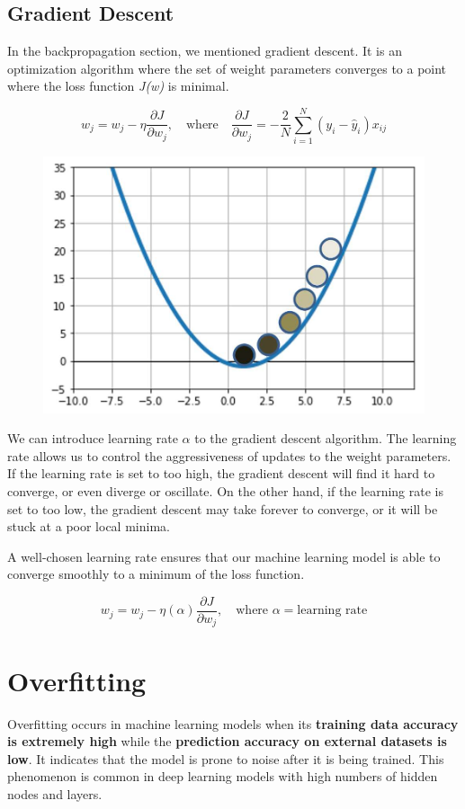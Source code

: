 \documentclass[12pt]{article}
\begin{document}
\subsection{Gradient Descent}
In the backpropagation section, we mentioned gradient descent. It is an optimization algorithm where the set of weight parameters converges to a point where the loss function \textit{J(w)} is minimal. 

\[
w_j = w_j - \eta \frac{\partial J}{\partial w_j}
, \quad \text{where} \quad
\frac{\partial J}{\partial w_j} = -\frac{2}{N} \sum_{i=1}^{N} (y_i - \hat{y}_i) x_{ij}
\]

\begin{figure}[h]
\centering
  \includegraphics[width=0.475\linewidth]{images/lecture_04/img_8.png}
  \label{fig:img_8}
\end{figure}

\newpage
We can introduce learning rate $\alpha$ to the gradient descent algorithm. The learning rate allows us to control the aggressiveness of updates to the weight parameters. If the learning rate is set to too high, the gradient descent will find it hard to converge, or even diverge or oscillate. On the other hand, if the learning rate is set to too low, the gradient descent may take forever to converge, or it will be stuck at a poor local minima.
\vspace{1.5em}

A well-chosen learning rate ensures that our machine learning model is able to converge smoothly to a minimum of the loss function.

\[
w_j = w_j - \eta (\alpha) \frac{\partial J}{\partial w_j}, \quad \text{where } \alpha = \text{learning rate} 
\]

\section{Overfitting}
Overfitting occurs in machine learning models when its \textbf{training data accuracy is extremely high} while the \textbf{prediction accuracy on external datasets is low}. It indicates that the model is prone to noise after it is being trained. This phenomenon is common in deep learning models with high numbers of hidden nodes and layers.
\vspace{1.5em}
\end{document}
